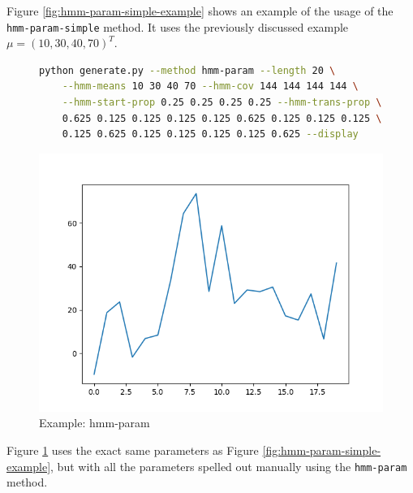Figure \ref{fig:hmm-param-simple-example} shows an example of the usage of the \texttt{hmm-param-simple} method. It uses the previously discussed example $\mu = (10, 30, 40, 70)^T$. 

\newpage

\begin{figure}
\begin{lstlisting}[language=bash]
    python generate.py --method hmm-param --length 20 \
    --hmm-means 10 30 40 70 --hmm-cov 144 144 144 144 \
    --hmm-start-prop 0.25 0.25 0.25 0.25 --hmm-trans-prop \
    0.625 0.125 0.125 0.125 0.125 0.625 0.125 0.125 0.125 \
    0.125 0.625 0.125 0.125 0.125 0.125 0.625 --display
\end{lstlisting}
\includegraphics[scale=0.7]{figures/hmm-param}
\caption{Example: hmm-param}    
\label{fig:hmm-param-example}
\end{figure}

Figure \ref{fig:hmm-param-example} uses the exact same parameters as Figure \ref{fig:hmm-param-simple-example}, but with all the parameters spelled out manually using the \texttt{hmm-param} method. 

\newpage

